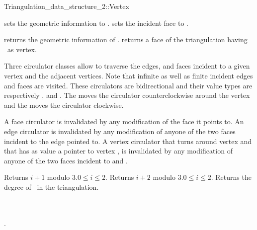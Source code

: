 \begin{ccRefConcept}{Triangulation_data_structure_2::Vertex}
\begin{ccAdvanced}

{sets the geometric information to .}
\ccGlue
{}
{sets the incident face to .}


\end{ccAdvanced}


{returns  the geometric information of \ccVar.}
\ccGlue
{}
{returns a face of the triangulation having  \ccVar\ as vertex.}

Three circulator classes allow to traverse the edges, and faces
incident to a given vertex and the adjacent vertices.
Note that infinite as well as finite incident edges and faces are visited.
 These circulators are bidirectional
and their value types are respectively , 
and .
The   moves the circulator
counterclockwise around the vertex 
and  the  moves the circulator
clockwise. 

A face circulator is invalidated by any modification of the face it
points to. An edge circulator is invalidated
by any modification of anyone of the two faces incident to the edge
pointed to.  A vertex circulator that turns around vertex 
and that has as value a pointer to vertex , is invalidated
by any modification of anyone of the two faces incident to 
and .

\ccGlue
{}
\ccGlue
{}


{Returns $i+1$ modulo 3.\ccPrecond $0\leq i \leq 2$.}
\ccGlue
{}
{Returns $i+2$ modulo 3.\ccPrecond $0\leq i \leq 2$.}
\ccGlue
{}
{Returns the degree of \ccVar\ in the triangulation.}


\ccHasModels
{}


\ccSeeAlso
{} \\
 \\
.



\end{ccRefConcept}


